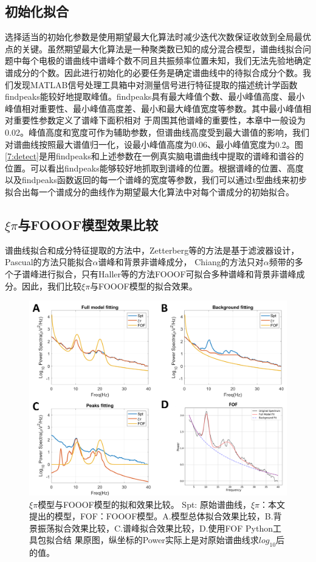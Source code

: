 \subsection{初始化拟合}
选择适当的初始化参数是使用期望最大化算法时减少迭代次数保证收敛到全局最优点的关键。虽然期望最大化算法是一种聚类数已知的成分混合模型，谱曲线拟合问题中每个电极的谱曲线中谱峰个数不同且共振频率位置未知，我们无法先验地确定谱成分的个数。因此进行初始化的必要任务是确定谱曲线中的待拟合成分个数。我们发现MATLAB信号处理工具箱中对测量信号进行特征提取的描述统计学函数findpeaks能较好地提取峰值。findpeaks具有最大峰值个数、最小峰值高度、最小峰值相对重要性、最小峰值高度差、最小和最大峰值宽度等参数。其中最小峰值相对重要性参数定义了谱峰下面积相对
于周围其他谱峰的重要性，本章中一般设为0.02。峰值高度和宽度可作为辅助参数，但谱曲线高度受到最大谱值的影响，我们对谱曲线按照最大谱值归一化，设最小峰值高度为0.06、最小峰值宽度为0.2。图\ref{7:detect}是用findpeaks和上述参数在一例真实脑电谱曲线中提取的谱峰和谱谷的位置。可以看出findpeaks能够较好地抓取到谱峰的位置。根据谱峰的位置、高度以及findpeaks函数返回的每一个谱峰的宽度等参数，我们可以通过t型曲线来初步拟合出每一个谱成分的曲线作为期望最大化算法中对每个谱成分的初始拟合。

\subsection{\texorpdfstring{$\xi\pi$}{ξπ}与FOOOF模型效果比较}
谱曲线拟合和成分特征提取的方法中，Zetterberg等的方法是基于滤波器设计，Pascual的方法只能拟合$\alpha$谱峰和背景非谱峰成分，
Chiang的方法只对$\alpha$频带的多个子谱峰进行拟合，只有Haller等的方法FOOOF可拟合多种谱峰和背景非谱峰成分。因此，我们比较$\xi\pi$与FOOOF模型的拟合效果。
\begin{figure}[!h]
	\includegraphics[width=15cm]{pic/xipi/comp.png}
	\caption{$\xi\pi$模型与FOOOF模型的拟和效果比较。 Spt: 原始谱曲线，$\xi\pi$：本文提出的模型，FOF：FOOOF模型。A.模型总体拟合效果比较，B.背景振荡拟合效果比较，C.谱峰拟合效果比较，D.使用FOF Python工具包拟合结
	果原图，纵坐标的Power实际上是对原始谱曲线求$log_{10}$后的值。}
	\label{7:comp}
\end{figure}

